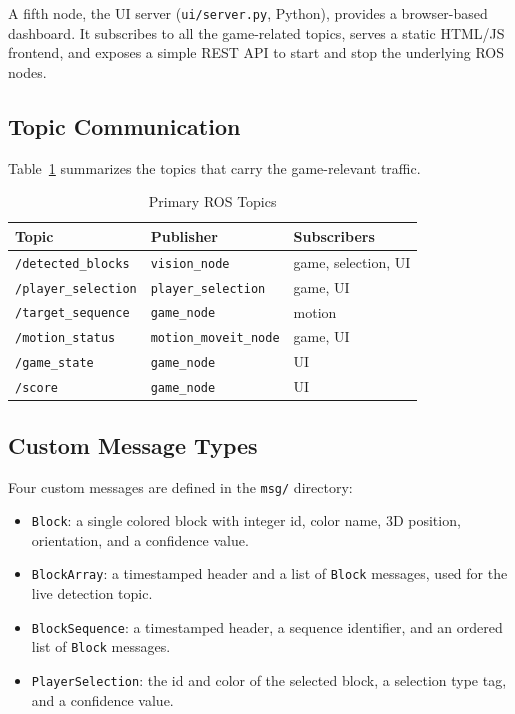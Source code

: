 \documentclass[conference]{IEEEtran}
\begin{document}
A fifth node, the UI server (\texttt{ui/server.py}, Python), provides
a browser-based dashboard. It subscribes to all the game-related
topics, serves a static HTML/JS frontend, and exposes a simple REST
API to start and stop the underlying ROS nodes.

\subsection{Topic Communication}

Table~\ref{tab:topics} summarizes the topics that carry the
game-relevant traffic.

\begin{table}[t]
\centering
\caption{Primary ROS Topics}
\label{tab:topics}
\begin{tabular}{lll}
\toprule
\textbf{Topic} & \textbf{Publisher} & \textbf{Subscribers} \\
\midrule
\texttt{/detected\_blocks} & \texttt{vision\_node} & game, selection, UI \\
\texttt{/player\_selection} & \texttt{player\_selection} & game, UI \\
\texttt{/target\_sequence} & \texttt{game\_node} & motion \\
\texttt{/motion\_status} & \texttt{motion\_moveit\_node} & game, UI \\
\texttt{/game\_state} & \texttt{game\_node} & UI \\
\texttt{/score} & \texttt{game\_node} & UI \\
\bottomrule
\end{tabular}
\end{table}

\subsection{Custom Message Types}

Four custom messages are defined in the \texttt{msg/} directory:

\begin{itemize}
\item \texttt{Block}: a single colored block with integer id, color
name, 3D position, orientation, and a confidence value.
\item \texttt{BlockArray}: a timestamped header and a list of
\texttt{Block} messages, used for the live detection topic.
\item \texttt{BlockSequence}: a timestamped header, a sequence
identifier, and an ordered list of \texttt{Block} messages.
\item \texttt{PlayerSelection}: the id and color of the selected block,
a selection type tag, and a confidence value.
\end{itemize}
\end{document}
